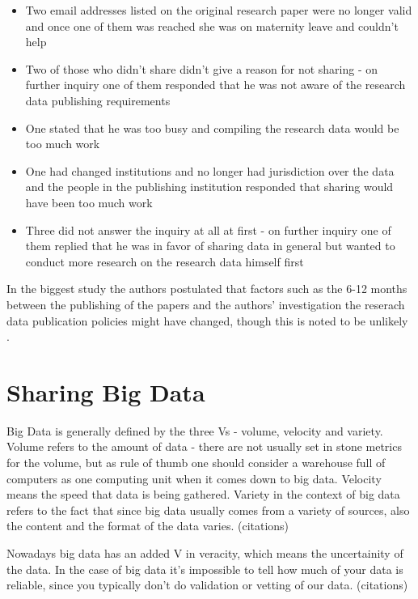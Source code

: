 \begin{itemize}
    \item Two email addresses listed on the original research paper were no
          longer valid and once one of them was reached she was on maternity
          leave and couldn't help
    \item Two of those who didn't share didn't give a reason for not sharing - on further
          inquiry one of them responded that he was not aware of the research
          data publishing requirements
    \item One stated that he was too busy and compiling the research data
          would be too much work
    \item One had changed institutions and no longer had jurisdiction over the
          data and the people in the publishing institution responded that
          sharing would have been too much work
    \item Three did not answer the inquiry at all at first - on further inquiry
          one of them replied that he was in favor of sharing data in general
          but wanted to conduct more research on the research data himself
          first
\end{itemize}

In the biggest study the authors postulated that factors such as the 6-12
months between the publishing of the papers and the authors' investigation
the reserach data publication policies might have changed, though this is noted
to be unlikely \cite{alsheikh2011public}.

\section{Sharing Big Data}

Big Data is generally defined by the three Vs - volume, velocity and variety.
Volume refers to the amount of data - there are not usually set in stone
metrics for the volume, but as rule of thumb one should consider a warehouse
full of computers as one computing unit when it comes down to big data.
Velocity means the speed that data is being gathered. Variety in the context
of big data refers to the fact that since big data usually comes from a variety
of sources, also the content and the format of the data varies. (citations)

Nowadays big data has an added V in veracity, which means the uncertainity of
the data. In the case of big data it's impossible to tell how much of your data
is reliable, since you typically don't do validation or vetting of our data.
(citations)

